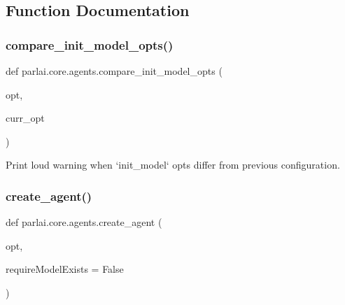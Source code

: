 \subsection{Function Documentation}
\mbox{\label{namespaceparlai_1_1core_1_1agents_a7eb0ec391b94a2adc51acdf8d2a35a68}} 
\subsubsection{\texorpdfstring{compare\+\_\+init\+\_\+model\+\_\+opts()}{compare\_init\_model\_opts()}}
{\footnotesize\ttfamily def parlai.\+core.\+agents.\+compare\+\_\+init\+\_\+model\+\_\+opts (\begin{DoxyParamCaption}\item[{}]{opt,  }\item[{}]{curr\+\_\+opt }\end{DoxyParamCaption})}

\begin{DoxyVerb}Print loud warning when `init_model` opts differ from previous configuration.
\end{DoxyVerb}
 \mbox{\label{namespaceparlai_1_1core_1_1agents_ad0d54074d4bcc148bb415ab5515a53b5}} 
\subsubsection{\texorpdfstring{create\+\_\+agent()}{create\_agent()}}
{\footnotesize\ttfamily def parlai.\+core.\+agents.\+create\+\_\+agent (\begin{DoxyParamCaption}\item[{}]{opt,  }\item[{}]{require\+Model\+Exists = {\ttfamily False} }\end{DoxyParamCaption})}

